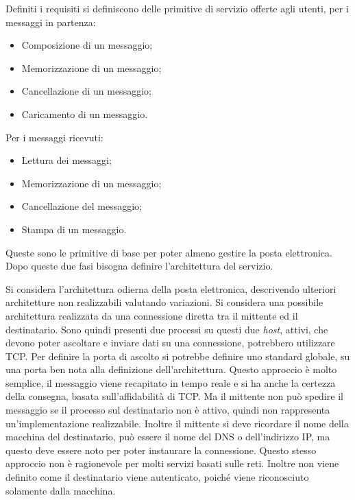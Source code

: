 \documentclass{article}
\numberwithin{equation}{subsection}
\begin{document}
Definiti i requisiti si definiscono delle primitive di servizio offerte agli utenti, per i messaggi in partenza:
\begin{itemize}
    \item Composizione di un messaggio;
    \item Memorizzazione di un messaggio;
    \item Cancellazione di un messaggio;
    \item Caricamento di un messaggio. 
\end{itemize}
Per i messaggi ricevuti:
\begin{itemize}
    \item Lettura dei messaggi;
    \item Memorizzazione di un messaggio;
    \item Cancellazione del messaggio;
    \item Stampa di un messaggio. 
\end{itemize}


Queste sono le primitive di base per poter almeno gestire la posta elettronica. Dopo queste due fasi bisogna 
definire l'architettura del servizio. 


Si considera l'architettura odierna della posta elettronica, descrivendo ulteriori architetture non realizzabili valutando variazioni. Si considera una possibile architettura realizzata da una connessione diretta tra il mittente ed il destinatario. Sono quindi presenti due processi su questi due \textit{host}, attivi, che devono poter ascoltare e inviare dati su una connessione, potrebbero utilizzare \textcolor{Bittersweet}{TCP}. Per definire la porta di ascolto si potrebbe definire uno standard globale, su una porta ben nota alla definizione dell'architettura. 
Questo approccio è molto semplice, il messaggio viene recapitato in tempo reale e si ha anche la certezza della consegna, basata sull'affidabilità di \textcolor{Bittersweet}{TCP}. 
Ma il mittente non può spedire il messaggio se il processo sul destinatario non è attivo, quindi non rappresenta un'implementazione realizzabile. Inoltre il mittente si deve ricordare il nome della macchina del destinatario, può essere il nome del \textcolor{Mahogany}{DNS} o dell'indirizzo \textcolor{Bittersweet}{IP}, ma questo deve essere noto per poter instaurare la connessione. 
Questo stesso approccio non è ragionevole per molti servizi basati sulle reti. Inoltre non viene definito come il destinatario viene autenticato, poiché viene riconosciuto solamente dalla macchina. 
\end{document}
